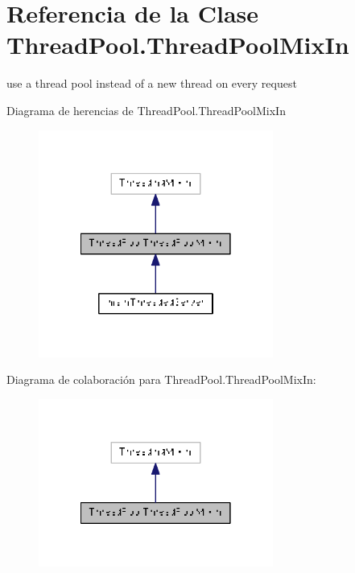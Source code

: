 \hypertarget{class_thread_pool_1_1_thread_pool_mix_in}{\section{Referencia de la Clase Thread\-Pool.\-Thread\-Pool\-Mix\-In}
\label{class_thread_pool_1_1_thread_pool_mix_in}
}


use a thread pool instead of a new thread on every request  




Diagrama de herencias de Thread\-Pool.\-Thread\-Pool\-Mix\-In\nopagebreak
\begin{figure}[H]
\begin{center}
\leavevmode
\includegraphics[width=218pt]{class_thread_pool_1_1_thread_pool_mix_in__inherit__graph}
\end{center}
\end{figure}


Diagrama de colaboración para Thread\-Pool.\-Thread\-Pool\-Mix\-In\-:\nopagebreak
\begin{figure}[H]
\begin{center}
\leavevmode
\includegraphics[width=218pt]{class_thread_pool_1_1_thread_pool_mix_in__coll__graph}
\end{center}
\end{figure}
